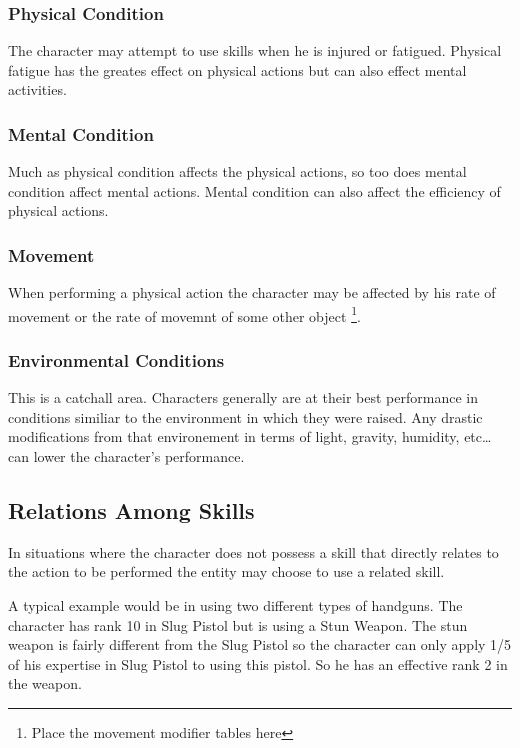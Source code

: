 

\subsubsection{Physical Condition}
The character may attempt to use skills when he is injured or 
fatigued. Physical fatigue has the greates effect on physical actions 
but can also effect mental activities.



\subsubsection{Mental Condition}
Much as physical condition affects the physical actions, so too does 
mental condition affect mental actions. Mental condition can also 
affect the efficiency of physical actions.



\subsubsection{Movement}
When performing a physical action the character may be affected by 
his rate of movement or the rate of movemnt of some other object 
\footnote{Place the movement modifier tables here}.

\subsubsection{Environmental Conditions}
This is a catchall area. Characters generally are at their best 
performance in conditions similiar to the environment in which they 
were raised. Any drastic modifications from that environement in 
terms of light, gravity, humidity, etc\dots can lower the character's 
performance.



\subsection{Relations Among Skills}

In situations where the character does not possess a skill that
directly relates to the action to be performed the entity may choose to use
a related skill.

A typical example would be in using two different types of handguns. The
character has rank 10 in Slug Pistol but is using a Stun Weapon. The stun
weapon is fairly different from the Slug Pistol so the character can only
apply 1/5 of his expertise in Slug Pistol to using this pistol. So he has
an effective rank 2 in the weapon.

